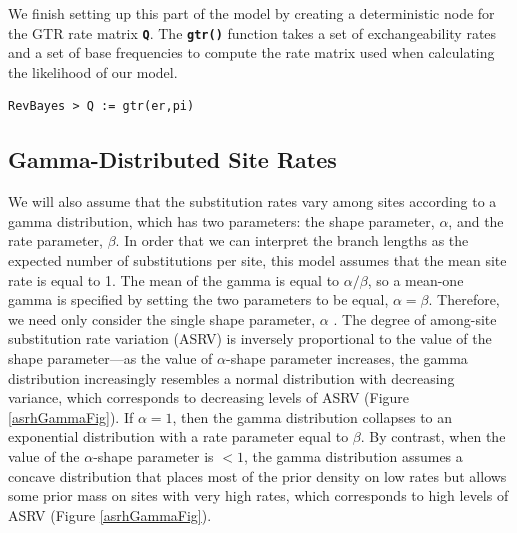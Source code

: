 \documentclass[11pt]{article}
\newcommand{\cl}[1]{{\texttt{\textbf{#1}}}}
\begin{document}
We finish setting up this part of the model by creating a deterministic node for the GTR rate matrix \cl{Q}. 
The \cl{gtr()} function takes a set of exchangeability rates and a set of base frequencies to compute the rate matrix used when calculating the likelihood of our model.
{\tt \begin{snugshade*}
\begin{lstlisting}
RevBayes > Q := gtr(er,pi)
\end{lstlisting}
\end{snugshade*}}


\subsection*{Gamma-Distributed Site Rates}


We will also assume that the substitution rates vary among sites according to a gamma distribution, which has two parameters: the shape parameter, $\alpha$, and the rate parameter, $\beta$. 
In order that we can interpret the branch lengths as the expected number of substitutions per site, this model assumes that the mean site rate is equal to 1.
The mean of the gamma is equal to $\alpha/\beta$, so a mean-one gamma is specified by setting the two parameters to be equal, $\alpha=\beta$.
Therefore, we need only consider the single shape parameter, $\alpha$ \citep{yang94a}. 
The degree of among-site substitution rate variation (ASRV) is inversely proportional to the value of the shape parameter---as the value of $\alpha$-shape parameter increases, the gamma distribution increasingly resembles a normal distribution with decreasing variance, which corresponds to decreasing levels of ASRV (Figure \ref{asrhGammaFig}).
If $\alpha = 1$, then the gamma distribution collapses to an exponential distribution with a rate parameter equal to $\beta$.
By contrast, when the value of the $\alpha$-shape parameter is $< 1$, the gamma distribution assumes a concave distribution that places most of the prior density on low rates but allows some prior mass on sites with very high rates, which corresponds to high levels of ASRV (Figure \ref{asrhGammaFig}).
\end{document}
